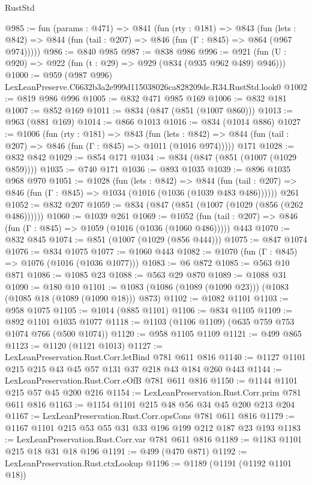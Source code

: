 \begin{lexlean}{RustStd}
\begin{coremodule}
@985 := fun (params : @471) =>
  @841
    (fun (rty : @181) =>
    @843
      (fun (lets : @842) => @844 (fun (tail : @207) => @846 (fun (Γ : @845) => @864 (@967 @974)))))
@986 := @840 @985
@987 := @838 @986
@996 := @921 (fun (U : @920) => @922 (fun (t : @29) => @929 (@834 (@935 @962 @489) @946)))
@1000 := @959 (@987 @996) LexLeanPreserve.C6632b3a2e999d115038026ca828209de.R34.RustStd.look0
@1002 := @819 @986 @996
@1005 := @832 @471 @985 @169
@1006 := @832 @181
@1007 := @852 @169
@1011 := @834 (@847 (@851 (@1007 @860)))
@1013 := @963 (@881 @169)
@1014 := @866 @1013
@1016 := @834 (@1014 @886)
@1027 := @1006
    (fun (rty : @181) =>
    @843
      (fun (lets : @842) =>
      @844 (fun (tail : @207) => @846 (fun (Γ : @845) => @1011 (@1016 @974)))))
    @171
@1028 := @832 @842
@1029 := @854 @171
@1034 := @834 (@847 (@851 (@1007 (@1029 @859))))
@1035 := @740 @171
@1036 := @893 @1035
@1039 := @896 @1035 @968 @970
@1051 := @1028
    (fun (lets : @842) =>
    @844 (fun (tail : @207) => @846 (fun (Γ : @845) => @1034 (@1016 (@1036 (@1039 @483 @486))))))
    @261
@1052 := @832 @207
@1059 := @834 (@847 (@851 (@1007 (@1029 (@856 (@262 @486))))))
@1060 := @1039 @261
@1069 := @1052
    (fun (tail : @207) => @846 (fun (Γ : @845) => @1059 (@1016 (@1036 (@1060 @486)))))
    @443
@1070 := @832 @845
@1074 := @851 (@1007 (@1029 (@856 @444)))
@1075 := @847 @1074
@1076 := @834 @1075
@1077 := @1060 @443
@1082 := @1070 (fun (Γ : @845) => @1076 (@1016 (@1036 @1077)))
@1083 := @6 @872
@1085 := @563 @10 @871
@1086 := @1085 @23
@1088 := @563 @29 @870
@1089 := @1088 @31
@1090 := @180 @10
@1101 := @1083 (@1086 (@1089 (@1090 @23))) (@1083 (@1085 @18 (@1089 (@1090 @18))) @873)
@1102 := @1082 @1101
@1103 := @958 @1075
@1105 := @1014 (@885 @1101)
@1106 := @834 @1105
@1109 := @892 @1101 @1035 @1077
@1118 := @1103 (@1106 @1109) (@635 @759 @753 @1074 @766 (@500 @1074))
@1120 := @958 @1105 @1109
@1121 := @499 @865
@1123 := @1120 (@1121 @1013)
@1127 := LexLeanPreservation.Rust.Corr.letBind @781 @611 @816
@1140 := @1127 @1101 @215 @215 @43 @45 @57 @131 @37 @218 @43 @184 @260 @443
@1144 := LexLeanPreservation.Rust.Corr.eOfB @781 @611 @816
@1150 := @1144 @1101 @215 @57 @45 @200 @216
@1154 := LexLeanPreservation.Rust.Corr.prim @781 @611 @816
@1163 := @1154 @1101 @215 @48 @56 @34 @45 @200 @213 @204
@1167 := LexLeanPreservation.Rust.Corr.opsCons @781 @611 @816
@1179 := @1167 @1101 @215 @53 @55 @31 @33 @196 @199 @212 @187 @23 @193
@1183 := LexLeanPreservation.Rust.Corr.var @781 @611 @816
@1189 := @1183 @1101 @215 @18 @31 @18 @196
@1191 := @499 (@470 @871)
@1192 := LexLeanPreservation.Rust.ctxLookup
@1196 := @1189 (@1191 (@1192 @1101 @18))

\end{coremodule}
\end{lexlean}
